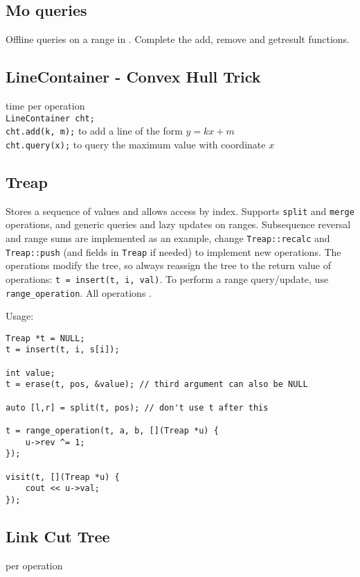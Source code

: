 \subsection{Mo queries}
Offline queries on a range in . Complete the add, remove and getresult functions.


\subsection{LineContainer - Convex Hull Trick}

 time per operation \\
\verb|LineContainer cht;| \\
\verb|cht.add(k, m);| to add a line of the form $y = kx + m$ \\
\verb|cht.query(x);| to query the maximum value with coordinate $x$


\subsection{Treap}

Stores a sequence of values and allows access by index. Supports \texttt{split} and \texttt{merge} operations, and generic queries and lazy updates on ranges. Subsequence reversal and range sums are implemented as an example, change \texttt{Treap::recalc} and \texttt{Treap::push} (and fields in \texttt{Treap} if needed) to implement new operations.
The operations modify the tree, so always reassign the tree to the return value of operations: \texttt{t = insert(t, i, val)}. To perform a range query/update, use \texttt{range\_operation}.
All operations .

Usage:
\begin{lstlisting}
Treap *t = NULL;
t = insert(t, i, s[i]);

int value;
t = erase(t, pos, &value); // third argument can also be NULL

auto [l,r] = split(t, pos); // don't use t after this

t = range_operation(t, a, b, [](Treap *u) {
	u->rev ^= 1;
});

visit(t, [](Treap *u) {
	cout << u->val;
});
\end{lstlisting}



\subsection{Link Cut Tree}
 per operation

